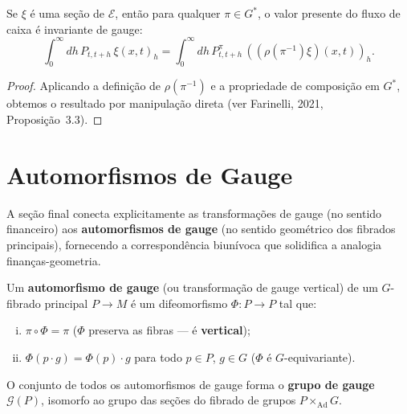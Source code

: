 \begin{prop}\label{prop:inv_cashflow}
Se $\xi$ \'e uma se\c{c}\~ao de $\mathcal{E}$, ent\~ao para qualquer
$\pi \in G^*$, o valor presente do fluxo de caixa \'e invariante de gauge:
\begin{equation}\label{eq:invar}
 \int_0^\infty dh \, P_{t,t+h} \, \xi(x,t)_h
 = \int_0^\infty dh \, P_{t,t+h}^\pi \, ((\rho(\pi^{-1}) \xi)(x,t))_h.
\end{equation}
\end{prop}
\begin{proof}
Aplicando a defini\c{c}\~ao de $\rho(\pi^{-1})$ e a propriedade de composi\c{c}\~ao
em $G^*$, obtemos o resultado por manipula\c{c}\~ao direta (ver Farinelli, 2021,
Proposi\c{c}\~ao~3.3).
\end{proof}

\section{Automorfismos de Gauge}

A se\c{c}\~ao final conecta explicitamente as transforma\c{c}\~oes de gauge
(no sentido financeiro) aos \textbf{automorfismos de gauge} (no sentido
geom\'etrico dos fibrados principais), fornecendo a correspond\^encia
biun\'ivoca que solidifica a analogia finan\c{c}as-geometria.

\begin{defi}\label{def:auto_gauge}
Um \textbf{automorfismo de gauge} (ou transforma\c{c}\~ao de gauge vertical)
de um $G$-fibrado principal $P \to M$ \'e um difeomorfismo
$\Phi: P \to P$ tal que:
\begin{enumerate}[(i)]
 \item $\pi \circ \Phi = \pi$ ($\Phi$ preserva as fibras --- \'e
 \textbf{vertical});
 \item $\Phi(p \cdot g) = \Phi(p) \cdot g$ para todo $p \in P$, $g \in G$
 ($\Phi$ \'e $G$-equivariante).
\end{enumerate}
O conjunto de todos os automorfismos de gauge forma o
\textbf{grupo de gauge} $\mathcal{G}(P)$, isomorfo ao grupo das se\c{c}\~oes
do fibrado de grupos $P \times_{\operatorname{Ad}} G$.
\end{defi}

